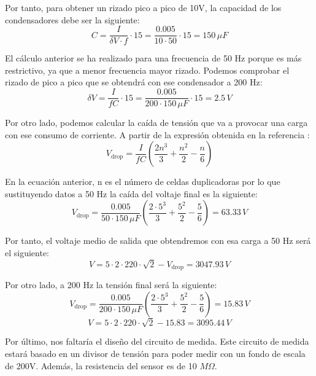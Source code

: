 Por tanto, para obtener un rizado pico a pico de 10V, la capacidad de los condensadores debe 
ser la siguiente:
\begin{equation}
    C = \frac{I}{\delta V\cdot f}\cdot15 = \frac{0.005}{10\cdot 50}\cdot 15 = 150\,\mu F
\end{equation}

El cálculo anterior se ha realizado para una frecuencia de 50 Hz porque es más restrictivo, 
ya que a menor frecuencia mayor rizado. Podemos comprobar el rizado de pico a pico que se obtendrá con ese condensador 
a 200 Hz:
\begin{equation}
    \delta V = \frac{I}{fC}\cdot15 = \frac{0.005}{200\cdot 150\,\mu F}\cdot15 = 2.5\,V
\end{equation}

Por otro lado, podemos calcular la caída de tensión que va a provocar una carga con ese 
consumo de corriente. A partir de la expresión obtenida en la referencia \cite{park2015reduction}:
\begin{equation}
    V_{\text{drop}} = \frac{I}{fC}\left(\frac{2n^3}{3}+\frac{n^2}{2}-\frac{n}{6}\right)
\end{equation}

En la ecuación anterior, n es el número de celdas duplicadoras por lo que sustituyendo datos a 50 Hz 
la caída del voltaje final es la siguiente:
\begin{equation}
    V_{\text{drop}} = \frac{0.005}{50\cdot 150\,\mu F}\left(\frac{2\cdot5^3}{3}+\frac{5^2}{2}-\frac{5}{6}\right) = 63.33\,V
\end{equation}

Por tanto, el voltaje medio de salida que obtendremos con esa carga a 50 Hz será el siguiente:
\begin{equation}
    V = 5\cdot2\cdot220\cdot\sqrt{2}-V_{\text{drop}} = 3047.93\,V
\end{equation}

Por otro lado, a 200 Hz la tensión final será la siguiente:
\begin{equation}
    V_{\text{drop}} = \frac{0.005}{200\cdot 150\,\mu F}\left(\frac{2\cdot5^3}{3}+\frac{5^2}{2}-\frac{5}{6}\right) = 15.83\,V
\end{equation}
\begin{equation}
    V = 5\cdot2\cdot220\cdot\sqrt{2}-15.83= 3095.44\,V
\end{equation}

Por último, nos faltaría el diseño del circuito de medida. Este circuito de medida estará basado en 
un divisor de tensión para poder medir con un fondo de escala de 200V. Además, la resistencia 
del sensor es de 10 $M\Omega$. 

